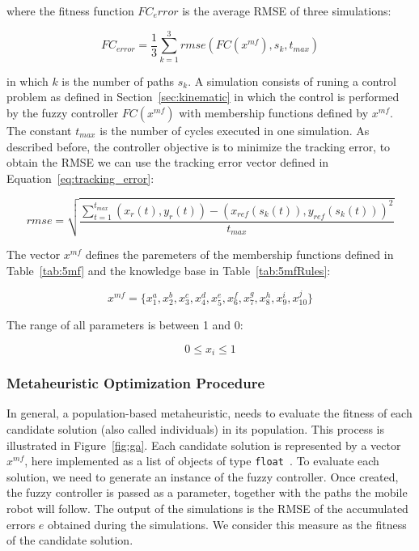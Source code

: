 \documentclass[symmetry,article,submit,moreauthors,pdftex]{Definitions/mdpi}
\begin{document}
where the fitness function $FC_error$ is the average RMSE of three simulations:

\begin{equation}
  FC_{error} = \frac{1}{3} \sum_{k=1}^3 rmse(FC(x^{mf}), s_k, t_{max}) 
\end{equation}

in which $k$ is the number of paths $s_k$. A simulation consists of runing a control problem as 
defined in Section~\ref{sec:kinematic} in which the control is
performed by the fuzzy controller $FC(x^{mf})$ with membership functions
defined by $x^{mf}$. The constant $t_{max}$ is the number of cycles executed in one simulation.
As described before, the controller objective is to minimize the tracking error, 
to obtain the RMSE we can use the tracking error vector defined in Equation~\ref{eq:tracking_error}:

\begin{equation}\label{eq:tracking_error}
 rmse = \sqrt{\frac{\sum_{t=1}^{t_{max}} (x_r(t),y_r(t))-(x_{ref}(s_k(t)),y_{ref}(s_k(t)))^2}{t_{max}}}
\end{equation}

The vector $x^{mf}$ defines the paremeters of the membership functions defined in Table~\ref{tab:5mf} 
and the knowledge base in Table~\ref{tab:5mfRules}: 

\begin{equation}\label{eq:mfs}
 x^{mf} = \{x_1^a, x_2^b, x_3^c, x_4^d, x_5^e, x_6^f, x_7^g, x_8^h, x_9^i, x_{10}^j\}
\end{equation}

The range of all parameters is between 1 and 0: 

\begin{equation}\label{eq:mfs}
  0 \leq x_i \leq 1
\end{equation}


\subsubsection{Metaheuristic Optimization Procedure}\label{sec:GAO}

In general, a population-based metaheuristic, needs to evaluate the fitness of
each candidate solution (also called individuals) in its population. This
process is illustrated in Figure~\ref{fig:ga}. Each candidate solution is
represented by a vector $x^{mf}$, here implemented as a list of objects of type {
\tt float }. To evaluate each solution, we need to generate an instance of the
fuzzy controller. Once created, the fuzzy controller is passed as a
parameter, together with the paths the mobile robot will follow. The output of
the simulations is the RMSE of the accumulated errors $e$ obtained during the
simulations. We consider this measure as the fitness of the candidate solution.
\end{document}
